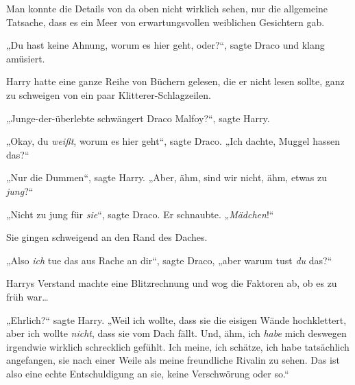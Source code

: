 \later

Man konnte die Details von da oben nicht wirklich sehen, nur die allgemeine Tatsache, dass es ein Meer von erwartungsvollen weiblichen Gesichtern gab.

„Du hast keine Ahnung, worum es hier geht, oder?“, sagte Draco und klang amüsiert.

Harry hatte eine ganze Reihe von Büchern gelesen, die er nicht lesen sollte, ganz zu schweigen von ein paar Klitterer-Schlagzeilen.

„Junge-der-überlebte schwängert Draco Malfoy?“, sagte Harry.

„Okay, du \emph{weißt}, worum es hier geht“, sagte Draco. „Ich dachte, Muggel hassen das?“

„Nur die Dummen“, sagte Harry. „Aber, ähm, sind wir nicht, ähm, etwas zu \emph{jung}?“

„Nicht zu jung für \emph{sie}“, sagte Draco. Er schnaubte. „\emph{Mädchen}!“

Sie gingen schweigend an den Rand des Daches.

„Also \emph{ich} tue das aus Rache an dir“, sagte Draco, „aber warum tust \emph{du} das?“

Harrys Verstand machte eine Blitzrechnung und wog die Faktoren ab, ob es zu früh war…

„Ehrlich?“ sagte Harry. „Weil ich wollte, dass sie die eisigen Wände hochklettert, aber ich wollte \emph{nicht}, dass sie vom Dach fällt. Und, ähm, ich \emph{habe} mich deswegen irgendwie wirklich schrecklich gefühlt. Ich meine, ich schätze, ich habe tatsächlich angefangen, sie nach einer Weile als meine freundliche Rivalin zu sehen. Das ist also eine echte Entschuldigung an sie, keine Verschwörung oder so.“


